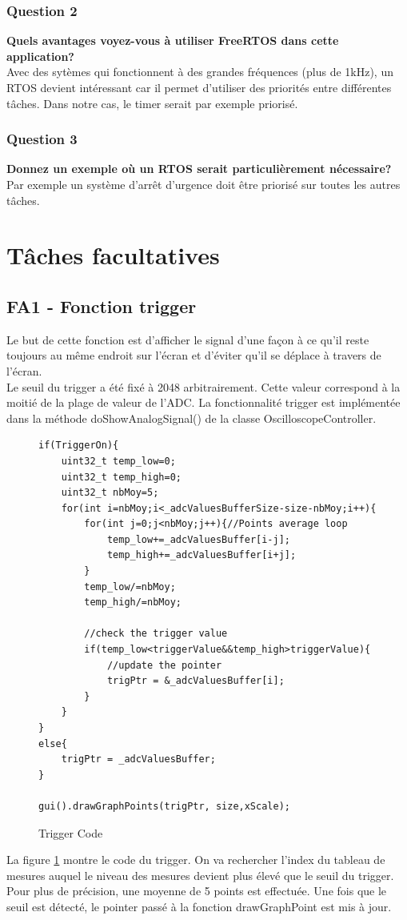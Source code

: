 \documentclass[12pt]{article}
\begin{document}
	\subsubsection{Question 2}
	\textbf{Quels avantages voyez-vous à utiliser FreeRTOS dans cette application?}\\
	Avec des sytèmes qui fonctionnent à des grandes fréquences (plus de 1kHz), un RTOS devient intéressant car il permet d'utiliser des priorités entre différentes tâches. Dans notre cas, le timer serait par exemple priorisé.
	\subsubsection{Question 3}
	\textbf{Donnez un exemple où un RTOS serait particulièrement nécessaire?}\\
	Par exemple un système d'arrêt d'urgence doit être priorisé sur toutes les autres tâches.
	\section{Tâches facultatives}
	\subsection{FA1 - Fonction trigger}
	Le but de cette fonction est d'afficher le signal d'une façon à ce qu'il reste toujours au même endroit sur l'écran et d’éviter qu’il se déplace à travers de l'écran.\\
	Le seuil du trigger a été fixé à 2048 arbitrairement. Cette valeur correspond à la moitié de la plage de valeur de l'ADC. La fonctionnalité trigger est implémentée dans la méthode doShowAnalogSignal() de la classe OscilloscopeController.\\
	
		\begin{figure}[H]
		\begin{lstlisting}
if(TriggerOn){
	uint32_t temp_low=0;
	uint32_t temp_high=0;
	uint32_t nbMoy=5;
	for(int i=nbMoy;i<_adcValuesBufferSize-size-nbMoy;i++){
		for(int j=0;j<nbMoy;j++){//Points average loop
			temp_low+=_adcValuesBuffer[i-j];
			temp_high+=_adcValuesBuffer[i+j];
		}
		temp_low/=nbMoy;
		temp_high/=nbMoy;
	
		//check the trigger value
		if(temp_low<triggerValue&&temp_high>triggerValue){
			//update the pointer
			trigPtr = &_adcValuesBuffer[i];
		}
	}
}
else{
	trigPtr = _adcValuesBuffer;
}

gui().drawGraphPoints(trigPtr, size,xScale);
		\end{lstlisting}
		\caption{Trigger Code}
		\label{code_trig}
	\end{figure}
La figure \ref{code_trig} montre le code du trigger. On va rechercher l'index du tableau de mesures auquel le niveau des mesures devient plus élevé que le seuil du trigger. Pour plus de précision, une moyenne de 5 points est effectuée. Une fois que le seuil est détecté, le pointer passé à la fonction drawGraphPoint est mis à jour.	
\end{document}
